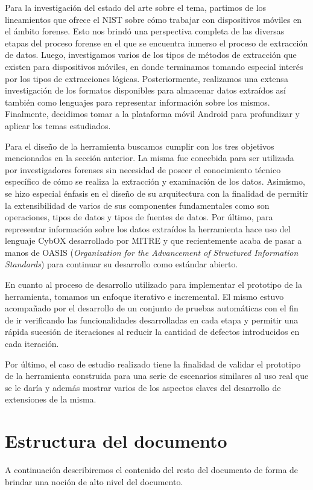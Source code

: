Para la investigación del estado del arte sobre el tema, partimos de los lineamientos que ofrece el NIST sobre cómo trabajar con dispositivos móviles en el ámbito forense. Esto nos brindó una perspectiva completa de las diversas etapas del proceso forense en el que se encuentra inmerso el proceso de extracción de datos. Luego, investigamos varios de los tipos de métodos de extracción que existen para dispositivos móviles, en donde terminamos tomando especial interés por los tipos de extracciones lógicas. Posteriormente, realizamos una extensa investigación de los formatos disponibles para almacenar datos extraídos así también como lenguajes para representar información sobre los mismos. Finalmente, decidimos tomar a la plataforma móvil Android para profundizar y aplicar los temas estudiados.

Para el diseño de la herramienta buscamos cumplir con los tres objetivos mencionados en la sección anterior. La misma fue concebida para ser utilizada por investigadores forenses sin necesidad de poseer el conocimiento técnico específico de cómo se realiza la extracción y examinación de los datos. Asimismo, se hizo especial énfasis en el diseño de su arquitectura con la finalidad de permitir la extensibilidad de varios de sus componentes fundamentales como son operaciones, tipos de datos y tipos de fuentes de datos. Por último, para representar información sobre los datos extraídos la herramienta hace uso del lenguaje CybOX desarrollado por MITRE y que recientemente acaba de pasar a manos de OASIS (\emph{Organization for the Advancement of Structured Information Standards}) para continuar su desarrollo como estándar abierto.

En cuanto al proceso de desarrollo utilizado para implementar el prototipo de la herramienta, tomamos un enfoque iterativo e incremental. El mismo estuvo acompañado por el desarrollo de un conjunto de pruebas automáticas con el fin de ir verificando las funcionalidades desarrolladas en cada etapa y permitir una rápida sucesión de iteraciones al reducir la cantidad de defectos introducidos en cada iteración.

Por último, el caso de estudio realizado tiene la finalidad de validar el prototipo de la herramienta construida para una serie de escenarios similares al uso real que se le daría y además mostrar varios de los aspectos claves del desarrollo de extensiones de la misma.

\section{Estructura del documento}
A continuación describiremos el contenido del resto del documento de forma de brindar una noción de alto nivel del documento.

